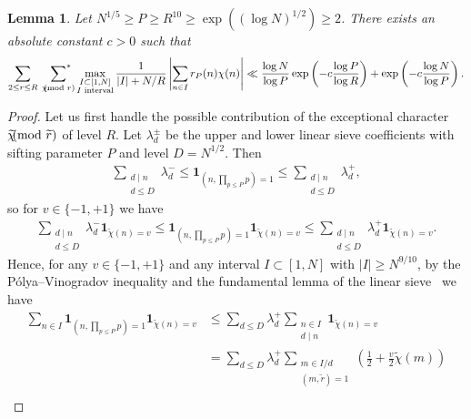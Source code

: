 \documentclass[12pt]{amsart}
\newtheorem{lemma}[theorem]{Lemma}
\theoremstyle{definition}
\theoremstyle{remark}
\numberwithin{equation}{section}
\newcommand{\asum}{\sideset{}{^{\ast}}\sum}
\newcommand{\1}{\mathbf{1}}
\renewcommand\d{\,\mathrm{d}}
\let\oldpmod\pmod
\renewcommand{\pmod}[1]{\hspace{-0.12cm}\oldpmod {#1}}
\begin{document}
\begin{lemma}\label{le:gallagher_rough}
	Let $N^{1/5}\geq P\geq  R^{10} \geq \exp((\log N)^{1/2})\geq 2$.  There exists an absolute constant $c>0$ such that
	\begin{align}\label{eq:Gallagher5}
		\sum_{2\leq r\leq R}\,\,\,\asum_{\chi\pmod r} \max_{\substack{I\subset [1,N]\\I \textnormal{ interval} \\ }}\frac{1}{|I|+N/R}\left|\sum_{n\in I}r_P(n)\chi(n)\right|\ll \frac{\log N}{\log P}\exp\left(-c\frac{\log P }{\log R}\right)+\exp\left(-c\frac{\log N }{\log P}\right).
	\end{align}
		
\end{lemma}



\begin{proof}
    Let us first handle the possible contribution of the exceptional character $\widetilde{\chi}\pmod{\widetilde{r}}$ of level $R$. Let $\lambda_d^{\pm}$ be the upper and lower linear sieve coefficients with sifting parameter $P$ and level $D=N^{1/2}$. Then 
    \begin{align*}
        \sum_{\substack{d\mid n\\d\leq D}}\lambda_d^{-} \leq  \1_{(n,\prod_{p\leq P}p)=1}\leq \sum_{\substack{d\mid n\\d\leq D}}\lambda_d^{+},  
    \end{align*}
    so for $v\in \{-1,+1\}$ we have
    \begin{align*}
        \sum_{\substack{d\mid n\\d\leq D}}\lambda_d^{-}\1_{\widetilde{\chi}(n)=v} \leq  \1_{(n,\prod_{p\leq P}p)=1}\1_{\widetilde{\chi}(n)=v}\leq \sum_{\substack{d\mid n\\d\leq D}}\lambda_d^{+}\1_{\widetilde{\chi}(n)=v} . 
    \end{align*}
     Hence, for any $v\in \{-1,+1\}$ and any interval $I\subset [1,N]$ with $|I|\geq N^{9/10}$, by the P\'olya--Vinogradov inequality and the fundamental lemma of the linear sieve~\cite[eq. (11.134) and Theorem 11.13]{cribro} we have
    \begin{align*}
        \sum_{n\in I}\1_{(n,\prod_{p\leq P}p)=1}\1_{\widetilde{\chi}(n)=v}&\leq \sum_{d\leq D}\lambda_d^{+}\sum_{\substack{n\in I\\d\mid n}}\1_{\widetilde{\chi}(n)=v}\\
        &=\sum_{d\leq D}\lambda_d^{+}\sum_{\substack{m\in I/d\\(m,\widetilde{r})=1}}\left(\frac{1}{2}+\frac{v}{2}\widetilde{\chi}(m)\right)\\

\end{align*}
\end{proof}
\end{document}
